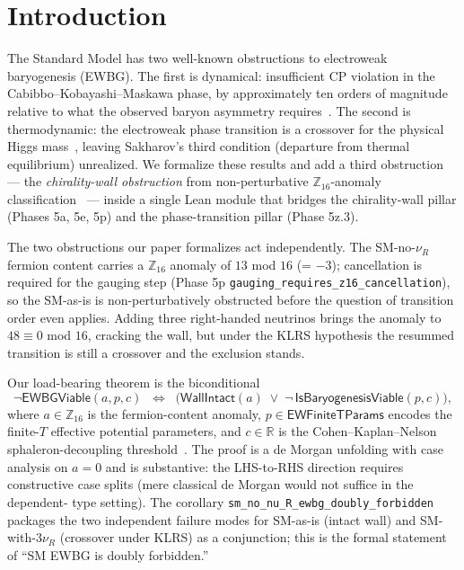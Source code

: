 \documentclass[aps,prl,twocolumn,showpacs,superscriptaddress,nofootinbib]{revtex4-2}
\newcommand{\WallIntact}{\mathsf{WallIntact}}
\newcommand{\EWBGViable}{\mathsf{EWBGViable}}
\newcommand{\Zsixteen}{\mathbb{Z}_{16}}
\begin{document}

\maketitle

\section{Introduction}
\label{sec:intro}

The Standard Model has two well-known obstructions to electroweak
baryogenesis (EWBG). The first is dynamical: insufficient CP violation
in the Cabibbo--Kobayashi--Maskawa phase, by approximately ten orders
of magnitude relative to what the observed baryon asymmetry
requires~\cite{Gavela1994,Huet1994}. The second is thermodynamic: the
electroweak phase transition is a crossover for the physical Higgs
mass~\cite{KLRS1996,CsikorFodorHeitger1999}, leaving Sakharov's third
condition (departure from thermal equilibrium) unrealized. We formalize
these results and add a third obstruction --- the
\emph{chirality-wall obstruction} from non-perturbative
$\Zsixteen$-anomaly classification~\cite{WangWanYou2022,Wang2020} ---
inside a single Lean module that bridges the chirality-wall pillar
(Phases 5a, 5e, 5p) and the phase-transition pillar (Phase 5z.3).

The two obstructions our paper formalizes act independently. The
SM-no-$\nu_R$ fermion content carries a $\Zsixteen$ anomaly of $13$ mod
$16$ (= $-3$); cancellation is required for the gauging step
(Phase 5p \texttt{gauging\_requires\_z16\_cancellation}), so the
SM-as-is is non-perturbatively obstructed before the question of
transition order even applies. Adding three right-handed neutrinos
brings the anomaly to $48 \equiv 0$ mod $16$, cracking the wall, but
under the KLRS hypothesis the resummed transition is still a crossover
and the exclusion stands.

Our load-bearing theorem is the biconditional
\begin{equation}
\label{eq:biconditional}
\neg \EWBGViable{}(a, p, c)
\;\;\Leftrightarrow\;\;
\bigl( \WallIntact{}(a) \;\vee\;
\neg\, \mathsf{IsBaryogenesisViable}(p, c) \bigr),
\end{equation}
where $a \in \Zsixteen$ is the fermion-content anomaly,
$p \in \mathsf{EWFiniteTParams}$ encodes the finite-$T$ effective
potential parameters, and $c \in \mathbb{R}$ is the Cohen--Kaplan--Nelson
sphaleron-decoupling threshold~\cite{CohenKaplanNelson1993}. The proof
is a de Morgan unfolding with case analysis on $a = 0$ and is
substantive: the LHS-to-RHS direction requires constructive case
splits (mere classical de Morgan would not suffice in the dependent-
type setting). The corollary
\texttt{sm\_no\_nu\_R\_ewbg\_doubly\_forbidden} packages the two
independent failure modes for SM-as-is (intact wall) and
SM-with-$3\nu_R$ (crossover under KLRS) as a conjunction; this is the
formal statement of ``SM EWBG is doubly forbidden.''
\end{document}

